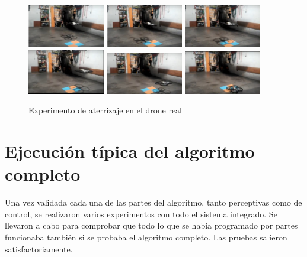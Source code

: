 \begin{figure}[H]
 \centering
    \includegraphics[width=0.30\textwidth]{imgs/aterrizaje_real1.jpg}
    \includegraphics[width=0.30\textwidth]{imgs/aterrizaje_real2.jpg}
    \includegraphics[width=0.30\textwidth]{imgs/aterrizaje_real3.jpg}\\
    \includegraphics[width=0.30\textwidth]{imgs/aterrizaje_real4.jpg}
    \includegraphics[width=0.30\textwidth]{imgs/aterrizaje_real5.jpg}
    \includegraphics[width=0.30\textwidth]{imgs/aterrizaje_real6.jpg}
 \caption{Experimento de aterrizaje en el drone real}
 \label{f:Aterrizaje con el drone real.}
\end{figure}


\section{Ejecuci\'on t\'ipica del algoritmo completo}\label{sec.algoritmocompleto}
\hspace{1cm} Una vez validada cada una de las partes del algoritmo, tanto perceptivas como de control, se realizaron varios experimentos con todo el sistema integrado. Se llevaron a cabo para comprobar que todo lo que se hab\'ia programado por partes funcionaba tambi\'en si se probaba el algoritmo completo. Las pruebas salieron satisfactoriamente.

